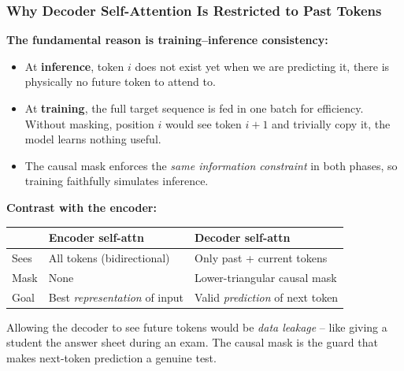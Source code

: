 \begin{frame}[fragile]\frametitle{Why Decoder Self-Attention Is Restricted to Past Tokens}
\textbf{The fundamental reason is training–inference consistency:}
\begin{itemize}
\item At \textbf{inference}, token $i$ does not exist yet when we are predicting it, 
      there is physically no future token to attend to.
\item At \textbf{training}, the full target sequence is fed in one batch for efficiency.
      Without masking, position $i$ would see token $i+1$ and trivially copy it, 
      the model learns nothing useful.
\item The causal mask enforces the \emph{same information constraint} in both phases,
      so training faithfully simulates inference.
\end{itemize}
\vspace{0.4em}
\textbf{Contrast with the encoder:}
\begin{center}
\small
\renewcommand{\arraystretch}{1.3}
\begin{tabular}{|l|l|l|}
\hline
 & \textbf{Encoder self-attn} & \textbf{Decoder self-attn} \\
\hline
Sees & All tokens (bidirectional) & Only past + current tokens \\
Mask & None & Lower-triangular causal mask \\
Goal & Best \emph{representation} of input & Valid \emph{prediction} of next token \\
\hline
\end{tabular}
\end{center}
\vspace{0.3em}
Allowing the decoder to see future tokens would be \emph{data leakage} –
like giving a student the answer sheet during an exam.
The causal mask is the guard that makes next-token prediction a genuine test.
\end{frame}

